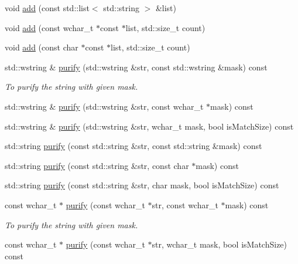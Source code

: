 \begin{DoxyCompactItemize}
void \hyperlink{classlakoo_1_1_text_purifier_ab5329c055bac1d28a85e16c90bab12d9}{add} (const std\+::list$<$ std\+::string $>$ \&list)
\item 
void \hyperlink{classlakoo_1_1_text_purifier_a18c9fc28060bb7e75dfcd88a277a2cbb}{add} (const wchar\+\_\+t $\ast$const $\ast$list, std\+::size\+\_\+t count)
\item 
void \hyperlink{classlakoo_1_1_text_purifier_a83426de858f38e94d5d48426cdc41149}{add} (const char $\ast$const $\ast$list, std\+::size\+\_\+t count)
\item 
std\+::wstring \& \hyperlink{classlakoo_1_1_text_purifier_a03abdabf613ea26d01a1643297660a82}{purify} (std\+::wstring \&str, const std\+::wstring \&mask) const
\begin{DoxyCompactList}\small\item\em To purify the string with given mask. \end{DoxyCompactList}\item 
std\+::wstring \& \hyperlink{classlakoo_1_1_text_purifier_a24a12d550199c8402081eed59a5deab7}{purify} (std\+::wstring \&str, const wchar\+\_\+t $\ast$mask) const
\item 
std\+::wstring \& \hyperlink{classlakoo_1_1_text_purifier_a8d1dab81e72c89cab2c991eab08dcffe}{purify} (std\+::wstring \&str, wchar\+\_\+t mask, bool is\+Match\+Size) const
\item 
std\+::string \hyperlink{classlakoo_1_1_text_purifier_a9c8a9f7009fa673e49999a9575eac0cf}{purify} (const std\+::string \&str, const std\+::string \&mask) const
\item 
std\+::string \hyperlink{classlakoo_1_1_text_purifier_a40382e6a751509a4c3737044fd06c93e}{purify} (const std\+::string \&str, const char $\ast$mask) const
\item 
std\+::string \hyperlink{classlakoo_1_1_text_purifier_a5e47d8d8bce3c6d3c34d13d43009e100}{purify} (const std\+::string \&str, char mask, bool is\+Match\+Size) const
\item 
const wchar\+\_\+t $\ast$ \hyperlink{classlakoo_1_1_text_purifier_aa17c1206115640f6f7556220639bdddc}{purify} (const wchar\+\_\+t $\ast$str, const wchar\+\_\+t $\ast$mask) const
\begin{DoxyCompactList}\small\item\em To purify the string with given mask. \end{DoxyCompactList}\item 
const wchar\+\_\+t $\ast$ \hyperlink{classlakoo_1_1_text_purifier_a87d4b9e6f1b4075ebfd582fae5ed50d1}{purify} (const wchar\+\_\+t $\ast$str, wchar\+\_\+t mask, bool is\+Match\+Size) const

\end{DoxyCompactItemize}
